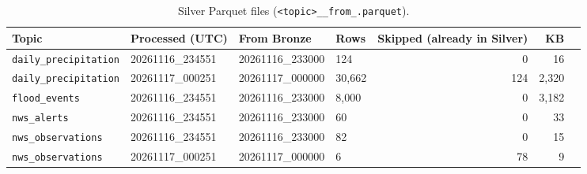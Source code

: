 \begin{table}[H]\centering\footnotesize
\caption{Silver Parquet files (\texttt{<topic>\_<processing time>\_from\_<Bronze file>.parquet}).}\label{tab:silver}
\begin{tabular}{@{}llllrrr@{}}\toprule
Topic & Processed (UTC) & From Bronze & Rows & Skipped (already in Silver) & KB\\\midrule
\texttt{daily\_precipitation} & 20261116\_234551 & 20261116\_233000 & 124 & 0 & 16\\
\texttt{daily\_precipitation} & 20261117\_000251 & 20261117\_000000 & 30,662 & 124 & 2,320\\
\texttt{flood\_events} & 20261116\_234551 & 20261116\_233000 & 8,000 & 0 & 3,182\\
\texttt{nws\_alerts} & 20261116\_234551 & 20261116\_233000 & 60 & 0 & 33\\
\texttt{nws\_observations} & 20261116\_234551 & 20261116\_233000 & 82 & 0 & 15\\
\texttt{nws\_observations} & 20261117\_000251 & 20261117\_000000 & 6 & 78 & 9\\
\bottomrule\end{tabular}\end{table}